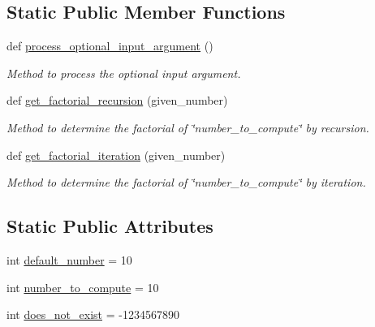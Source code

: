 \subsection*{Static Public Member Functions}
\begin{DoxyCompactItemize}
\item 
def \hyperlink{classutilities_1_1timing__measurements_1_1get__factorial_1_1calculate__factorial_a799aaf842a0c6c98d31ee1cad8381caa}{process\+\_\+optional\+\_\+input\+\_\+argument} ()
\begin{DoxyCompactList}\small\item\em Method to process the optional input argument. \end{DoxyCompactList}\item 
def \hyperlink{classutilities_1_1timing__measurements_1_1get__factorial_1_1calculate__factorial_ad985135073d51b522bdfb4c5b5569456}{get\+\_\+factorial\+\_\+recursion} (given\+\_\+number)
\begin{DoxyCompactList}\small\item\em Method to determine the factorial of \char`\"{}number\+\_\+to\+\_\+compute\char`\"{} by recursion. \end{DoxyCompactList}\item 
def \hyperlink{classutilities_1_1timing__measurements_1_1get__factorial_1_1calculate__factorial_a4233e6dad246c88e546c31f5752a1ee1}{get\+\_\+factorial\+\_\+iteration} (given\+\_\+number)
\begin{DoxyCompactList}\small\item\em Method to determine the factorial of \char`\"{}number\+\_\+to\+\_\+compute\char`\"{} by iteration. \end{DoxyCompactList}\end{DoxyCompactItemize}
\subsection*{Static Public Attributes}
\begin{DoxyCompactItemize}
\item 
int \hyperlink{classutilities_1_1timing__measurements_1_1get__factorial_1_1calculate__factorial_a52e3407bbd93719d9c77e49706a47362}{default\+\_\+number} = 10
\item 
int \hyperlink{classutilities_1_1timing__measurements_1_1get__factorial_1_1calculate__factorial_a04cd527a2af28e713e8665e2d40b1fae}{number\+\_\+to\+\_\+compute} = 10
\item 
int \hyperlink{classutilities_1_1timing__measurements_1_1get__factorial_1_1calculate__factorial_a16363bc4d672d6352ce3618abeb8e74f}{does\+\_\+not\+\_\+exist} = -\/1234567890
\end{DoxyCompactItemize}


